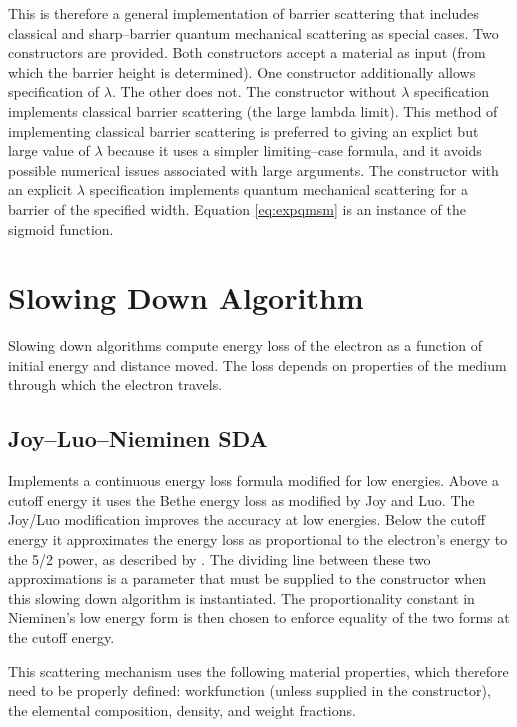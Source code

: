 This is therefore a general implementation of barrier scattering that includes classical and sharp--barrier quantum mechanical scattering as special cases. Two constructors are provided. Both constructors accept a material as input (from which the barrier height is determined). One constructor additionally allows specification of $\lambda$. The other does not. The constructor without $\lambda$ specification implements classical barrier scattering (the large lambda limit). This method of implementing classical barrier scattering is preferred to giving an explict but large value of $\lambda$ because it uses a simpler limiting--case formula, and it avoids possible numerical issues associated with large arguments. The constructor with an explicit $\lambda$ specification implements quantum mechanical scattering for a barrier of the specified width. Equation \ref{eq:expqmsm} is an instance of the sigmoid function. 

\section{Slowing Down Algorithm}\label{con:sda}
Slowing down algorithms compute energy loss of the electron as a function of initial energy and distance moved. The loss depends on properties of the medium through which the electron travels. 
 
\subsection{Joy--Luo--Nieminen SDA}
Implements a continuous energy loss formula modified for low energies. Above a cutoff energy it uses the Bethe energy loss as modified by Joy and Luo. The Joy/Luo modification improves the accuracy at low energies. Below the cutoff energy it approximates the energy loss as proportional to the electron's energy to the 5/2 power, as described by \cite{Nieminen}. The dividing line between these two approximations is a parameter that must be supplied to the constructor when this slowing down algorithm is instantiated. The proportionality constant in Nieminen's low energy form is then chosen to enforce equality of the two forms at the cutoff energy. 

This scattering mechanism uses the following material properties, which therefore need to be properly defined: workfunction (unless supplied in the constructor), the elemental composition, density, and weight fractions. 
